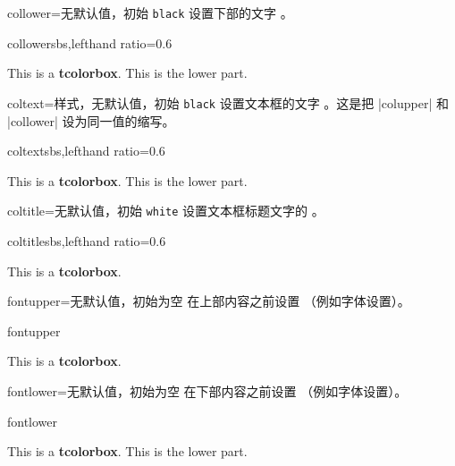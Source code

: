 \begin{docTcbKey}{collower}{=}{无默认值，初始 \texttt{black}}
  设置下部的文字 。
\begin{exdispExample*}{collower}{sbs,lefthand ratio=0.6}
\begin{tcolorbox}[collower=red!75!black]
This is a \textbf{tcolorbox}.
\tcblower
This is the lower part.
\end{tcolorbox}
\end{exdispExample*}
\end{docTcbKey}


\begin{docTcbKey}{coltext}{=}{样式，无默认值，初始 \texttt{black}}
  设置文本框的文字 。这是把 |colupper| 和 |collower|
  设为同一值的缩写。
\begin{exdispExample*}{coltext}{sbs,lefthand ratio=0.6}
\begin{tcolorbox}[coltext=red!75!black]
This is a \textbf{tcolorbox}.
\tcblower
This is the lower part.
\end{tcolorbox}
\end{exdispExample*}
\end{docTcbKey}


\begin{docTcbKey}{coltitle}{=}{无默认值，初始 \texttt{white}}
  设置文本框标题文字的 。
\begin{exdispExample*}{coltitle}{sbs,lefthand ratio=0.6}
\begin{tcolorbox}[coltitle=red!75!black,
  colbacktitle=black!10!white,title=Test]
This is a \textbf{tcolorbox}.
\end{tcolorbox}
\end{exdispExample*}
\end{docTcbKey}

\clearpage

\begin{docTcbKey}{fontupper}{=}{无默认值，初始为空}
  在上部内容之前设置 （例如字体设置）。
\begin{exdispExample}{fontupper}
\begin{tcolorbox}[fontupper=Hello!~\sffamily]
This is a \textbf{tcolorbox}.
\end{tcolorbox}
\end{exdispExample}
\end{docTcbKey}


\begin{docTcbKey}{fontlower}{=}{无默认值，初始为空}
  在下部内容之前设置 （例如字体设置）。
\begin{exdispExample}{fontlower}
\begin{tcolorbox}[fontlower=\sffamily\bfseries]
This is a \textbf{tcolorbox}.
\tcblower
This is the lower part.
\end{tcolorbox}
\end{exdispExample}
\end{docTcbKey}


